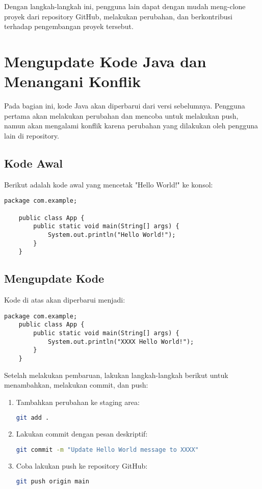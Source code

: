 Dengan langkah-langkah ini, pengguna lain dapat dengan mudah meng-clone proyek dari repository GitHub, melakukan perubahan, dan berkontribusi terhadap pengembangan proyek tersebut.

\section{Mengupdate Kode Java dan Menangani Konflik}

Pada bagian ini, kode Java akan diperbarui dari versi sebelumnya. Pengguna pertama akan melakukan perubahan dan mencoba untuk melakukan push, namun akan mengalami konflik karena perubahan yang dilakukan oleh pengguna lain di repository. 

\subsection{Kode Awal}

Berikut adalah kode awal yang mencetak "Hello World!" ke konsol:

\begin{lstlisting}[style=java]
	package com.example;
	
	public class App {
		public static void main(String[] args) {
			System.out.println("Hello World!");
		}
	}
\end{lstlisting}

\subsection{Mengupdate Kode}

Kode di atas akan diperbarui menjadi:

\begin{lstlisting}[style=java]
	package com.example;
	public class App {
		public static void main(String[] args) {
			System.out.println("XXXX Hello World!");
		}
	}
\end{lstlisting}

Setelah melakukan pembaruan, lakukan langkah-langkah berikut untuk menambahkan, melakukan commit, dan push:

\begin{enumerate}
	\item Tambahkan perubahan ke staging area:
	\begin{lstlisting}[language=bash]
		git add .
	\end{lstlisting}
	
	\item Lakukan commit dengan pesan deskriptif:
	\begin{lstlisting}[language=bash]
		git commit -m "Update Hello World message to XXXX"
	\end{lstlisting}
	
	\item Coba lakukan push ke repository GitHub:
	\begin{lstlisting}[language=bash]
		git push origin main
	\end{lstlisting}
\end{enumerate}

